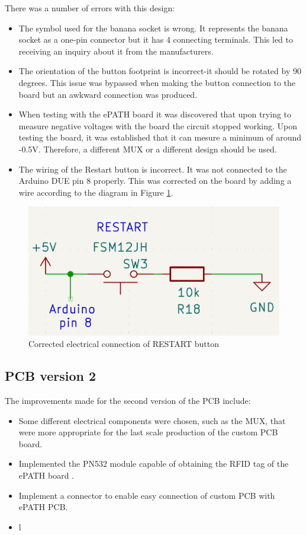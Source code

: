 There was a number of errors with this design:
\begin{itemize}
\item The symbol used for the banana socket is wrong. It represents the banana socket as a one-pin connector but it has 4 connecting terminals. This led to receiving an inquiry about it from the manufacturers.
\item The orientation of the button footprint is incorrect-it should be rotated by 90 degrees. This issue was bypassed when making the button connection to the board but an awkward connection was produced.
\item When testing with the ePATH board it was discovered that upon trying to measure negative voltages with the board the circuit stopped working. Upon testing the board, it was established that it can mesure a minimum of around -0.5V. Therefore, a different MUX or a different design should be used.
\item The wiring of the Restart button is incorrect. It was not connected to the Arduino DUE pin 8 properly. This was corrected on the board by adding a wire according to the diagram in Figure \ref{button_wiring}.
\end{itemize}

\begin{figure}[H]
          \centering
          \includegraphics[width=1\linewidth]{img/button_wiring.png}
          \caption{Corrected electrical connection of RESTART button}
          \label{button_wiring}
    \end{figure}



\subsection{PCB version 2}
The improvements made for the second version of the PCB include:
\begin{itemize}
\item Some different electrical components were chosen, such as the MUX, that were more appropriate for the last scale production of the custom PCB board.
\item Implemented the PN532 module capable of obtaining the RFID tag of the ePATH board \cite{pn532manual}.
\item Implement a connector to enable easy connection of custom PCB with ePATH PCB.
\item l
\end{itemize}

